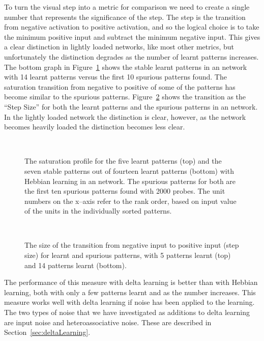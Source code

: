 To turn the visual step into a metric for comparison we need to create a single number that represents the significance of the step.  The step is the transition from negative activation to positive activation, and so the logical choice is to take the minimum positive input and subtract the minimum negative input.  This gives a clear distinction in lightly loaded networks, like most other metrics, but unfortunately the distinction degrades as the number of learnt patterns increases.  The bottom graph in Figure~\ref{fig:SaturationProfile} shows the stable learnt patterns in an \hopnet{100\pm}{} network with 14 learnt patterns versus the first 10 spurious patterns found.  The saturation transition from negative to positive of some of the patterns has become similar to the spurious patterns. Figure~\ref{fig:SaturationProfileOverloadComp} shows the transition as the ``Step Size'' for both the learnt patterns and the spurious patterns in an \hopnet{100\pm}{} network.  In the lightly loaded network the distinction is clear, however, as the network becomes heavily loaded the distinction becomes less clear. 

\begin{figure}[p]
\small
\center
	\scalebox{1.0}{}
	\\
	\scalebox{1.0}{}
	\caption{The saturation profile for the five learnt patterns (top) and the seven stable patterns out of fourteen learnt patterns (bottom) with Hebbian learning in an  network.  The spurious patterns for both are the first ten spurious patterns found with 2000 probes. The unit numbers on the x--axis refer to the rank order, based on input value of the units in the individually sorted patterns.}
	\label{fig:SaturationProfile}
\end{figure}


\begin{figure}[p]
\center
\small
	
	\vspace{1cm}\\
	
	\caption{The size of the transition from negative input to positive input (step size) for learnt and spurious patterns, with 5 patterns learnt (top) and 14 patterns learnt (bottom).}
	\label{fig:SaturationProfileOverloadComp}
\end{figure}

The performance of this measure with delta learning is better than with Hebbian learning, both with only a few patterns learnt and as the number increases.  This measure works well with delta learning if noise has been applied to the learning. The two types of noise that we have investigated as additions to delta learning are input noise and heteroassociative noise.  These are described in Section~\ref{sec:deltaLearning}. 

